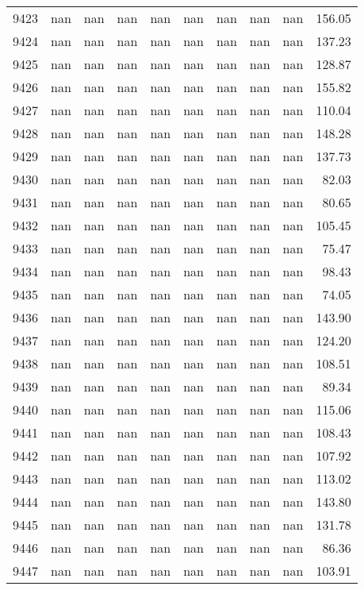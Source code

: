 \begin{tabular}{lrrrrrrrrr}
9423 & nan & nan & nan & nan & nan & nan & nan & nan & 156.05 \\
9424 & nan & nan & nan & nan & nan & nan & nan & nan & 137.23 \\
9425 & nan & nan & nan & nan & nan & nan & nan & nan & 128.87 \\
9426 & nan & nan & nan & nan & nan & nan & nan & nan & 155.82 \\
9427 & nan & nan & nan & nan & nan & nan & nan & nan & 110.04 \\
9428 & nan & nan & nan & nan & nan & nan & nan & nan & 148.28 \\
9429 & nan & nan & nan & nan & nan & nan & nan & nan & 137.73 \\
9430 & nan & nan & nan & nan & nan & nan & nan & nan & 82.03 \\
9431 & nan & nan & nan & nan & nan & nan & nan & nan & 80.65 \\
9432 & nan & nan & nan & nan & nan & nan & nan & nan & 105.45 \\
9433 & nan & nan & nan & nan & nan & nan & nan & nan & 75.47 \\
9434 & nan & nan & nan & nan & nan & nan & nan & nan & 98.43 \\
9435 & nan & nan & nan & nan & nan & nan & nan & nan & 74.05 \\
9436 & nan & nan & nan & nan & nan & nan & nan & nan & 143.90 \\
9437 & nan & nan & nan & nan & nan & nan & nan & nan & 124.20 \\
9438 & nan & nan & nan & nan & nan & nan & nan & nan & 108.51 \\
9439 & nan & nan & nan & nan & nan & nan & nan & nan & 89.34 \\
9440 & nan & nan & nan & nan & nan & nan & nan & nan & 115.06 \\
9441 & nan & nan & nan & nan & nan & nan & nan & nan & 108.43 \\
9442 & nan & nan & nan & nan & nan & nan & nan & nan & 107.92 \\
9443 & nan & nan & nan & nan & nan & nan & nan & nan & 113.02 \\
9444 & nan & nan & nan & nan & nan & nan & nan & nan & 143.80 \\
9445 & nan & nan & nan & nan & nan & nan & nan & nan & 131.78 \\
9446 & nan & nan & nan & nan & nan & nan & nan & nan & 86.36 \\
9447 & nan & nan & nan & nan & nan & nan & nan & nan & 103.91 \\

\end{tabular}
